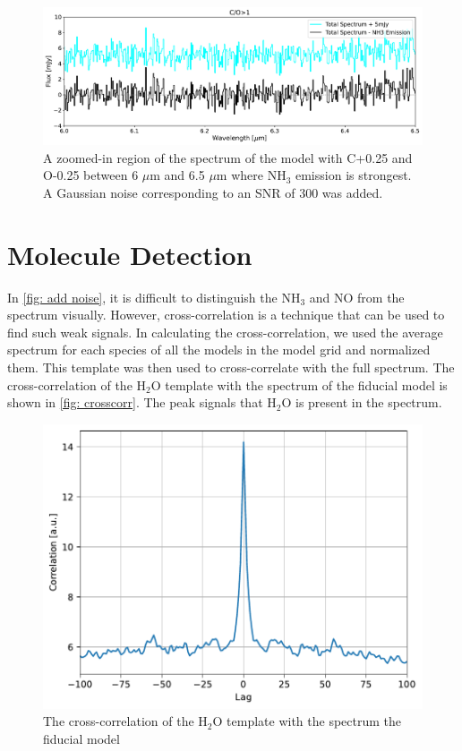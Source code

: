\documentclass[oneside, single, authoryear, semicolon, 12pt]{lion-msc}
\newcommand{\4}{$_4$}
\newcommand{\3}{$_3$}
\newcommand{\2}{$_2$}
\begin{document}
\begin{figure}[H]
    \centering
    \includegraphics[width=\linewidth]{Figures/AddNoise.pdf}
    \caption{A zoomed-in region of the spectrum of the model with C+0.25 and O-0.25 between 6 $\mu$m and 6.5 $\mu$m where NH\3 emission is strongest. A Gaussian noise corresponding to an SNR of 300 was added.}
    \label{fig: add noise}
\end{figure}

\section{Molecule Detection}
In \autoref{fig: add noise}, it is difficult to distinguish the NH\3 and NO from the spectrum visually. However, cross-correlation is a technique that can be used to find such weak signals. In calculating the cross-correlation, we used the average spectrum for each species of all the models in the model grid and normalized them. This template was then used to cross-correlate with the full spectrum. The cross-correlation of the H\2O template with the spectrum of the fiducial model is shown in \autoref{fig: crosscorr}. The peak signals that H\2O is present in the spectrum. 

\begin{figure}[H]
    \centering
    \includegraphics[width=.6\linewidth]{Figures/Cross-Correlation.pdf}
    \caption{The cross-correlation of the H\2O template with the spectrum the fiducial model}
    \label{fig: crosscorr}
\end{figure}
\end{document}
